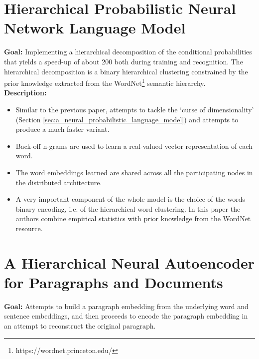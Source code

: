 \documentclass[11pt,a4paper]{article}
\begin{document}


\section{Hierarchical Probabilistic Neural Network Language Model} %
\label{sec:hierarchical_probabilistic_neural_network_language_model}

  \textbf{Goal:}
  Implementing a  hierarchical decomposition of the conditional probabilities that yields a speed-up of about 200 both during training and recognition. The hierarchical decomposition is a binary hierarchical clustering constrained by the prior knowledge extracted from the WordNet\footnote{https://wordnet.princeton.edu/} semantic hierarchy\cite{morin2005hierarchical}.\\

  \textbf{Description:}
  \begin{itemize}
    \item
    Similar to the previous paper, attempts to tackle the `curse of dimensionality' (Section \ref{sec:a_neural_probabilistic_language_model}) and attempts to produce a much faster variant.
    \item
    Back-off n-grams are used to learn a real-valued vector representation of each word.
    \item
    The word embeddings learned are shared across all the participating nodes in the distributed architecture.
    \item
    A very important component of the whole model is the choice of the words binary encoding, i.e. of the hierarchical word clustering. In this paper the authors combine empirical statistics with prior knowledge from the WordNet resource.
  \end{itemize}



\section{A Hierarchical Neural Autoencoder for Paragraphs and Documents} %
\label{sec:a_hierarchical_neural_autoencoder_for_paragraphs_and_documents}

  \textbf{Goal:}
  Attempts to build a paragraph embedding from the underlying word and sentence embeddings, and then proceeds to encode the paragraph embedding in an attempt to reconstruct the original paragraph\cite{li2015hierarchical}.\\
\end{document}
